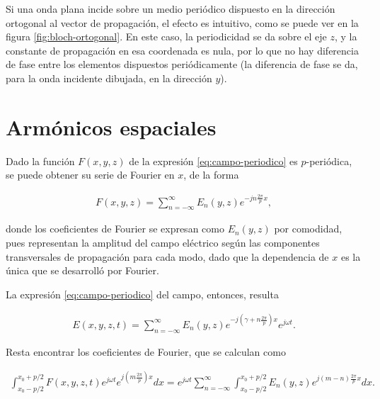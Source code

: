 Si una onda plana incide sobre un medio periódico dispuesto en la dirección ortogonal al vector de propagación, el efecto es intuitivo, como se puede ver en la figura \ref{fig:bloch-ortogonal}. En este caso, la periodicidad se da sobre el eje $z$, y la constante de propagación en esa coordenada es nula, por lo que no hay diferencia de fase entre los elementos dispuestos periódicamente (la diferencia de fase se da, para la onda incidente dibujada, en la dirección $y$).


\section{Armónicos espaciales}

Dado la función $F(x,y,z)$ de la expresión \ref{eq:campo-periodico} es $p$-periódica, se puede obtener su serie de Fourier en $x$, de la forma

\begin{align}
F(x,y,z) = \sum_{n=-\infty}^{\infty} E_{n}(y,z) e^{-j n \frac{2\pi}{p} x},
\end{align}

donde los coeficientes de Fourier se expresan como $E_n(y,z)$ por comodidad, pues representan la amplitud del campo eléctrico según las componentes transversales de propagación para cada modo, dado que la dependencia de $x$ es la única que se desarrolló por Fourier. 

La expresión \ref{eq:campo-periodico} del campo, entonces, resulta

\begin{align}
E(x,y,z,t) = \sum_{n=-\infty}^{\infty} E_{n}(y,z) e^{-j \left(\gamma + n \frac{2\pi}{p}\right) x} e^{j\omega t}.
\end{align}

Resta encontrar los coeficientes de Fourier, que se calculan como

\begin{align}
\int_{x_0-p/2}^{x_0+p/2} F(x,y,z,t) e^{j\omega t} e^{j \left(m \frac{2\pi}{p}\right) x} dx = e^{j\omega t} \sum_{n=-\infty}^{\infty} \int_{x_0-p/2}^{x_0+p/2} E_{n}(y,z) e^{j (m-n) \frac{2\pi}{p} x} dx.
\end{align}

